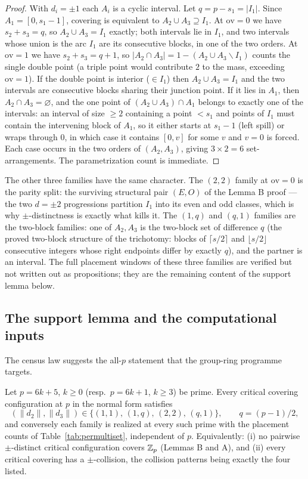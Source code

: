 \begin{proof}
With $d_i=\pm1$ each $A_i$ is a cyclic interval. Let $q=p-s_1=|I_1|$. Since
$A_1=[0,s_1-1]$, covering is equivalent to $A_2\cup A_3\supseteq I_1$.
At $\mathrm{ov}=0$ we have $s_2+s_3=q$, so $A_2\cup A_3=I_1$ exactly; both
intervals lie in $I_1$, and two intervals whose union is the arc $I_1$ are
its consecutive blocks, in one of the two orders. At $\mathrm{ov}=1$ we have
$s_2+s_3=q+1$, so $|A_2\cap A_3|=1-(A_2\cup A_3\smallsetminus I_1)$ counts
the single double point (a triple point would contribute $2$ to the mass,
exceeding $\mathrm{ov}=1$). If the double point is interior
($\in I_1$) then $A_2\cup A_3=I_1$ and the two intervals are consecutive
blocks sharing their junction point. If it lies in $A_1$, then
$A_2\cap A_3=\varnothing$, and the one point of $(A_2\cup A_3)\cap A_1$
belongs to exactly one of the intervals: an interval of size $\ge2$
containing a point $<s_1$ and points of $I_1$ must contain the intervening
block of $A_1$, so it either starts at $s_1-1$ (left spill) or wraps through
$0$, in which case it contains $[0,v]$ for some $v$ and $v=0$ is forced.
Each case occurs in the two orders of $(A_2,A_3)$, giving $3\times2=6$
set-arrangements. The parametrization count is immediate.
\end{proof}

The other three families have the same character. The $(2,2)$ family at
$\mathrm{ov}=0$ is the parity split: the surviving structural pair
$(E,O)$ of the Lemma B proof --- the two $d=\pm2$ progressions partition
$I_1$ into its even and odd classes, which is why $\pm$-distinctness is
exactly what kills it. The $(1,q)$ and $(q,1)$ families are the two-block
families: one of $A_2,A_3$ is the two-block set of difference $q$
(the proved two-block structure of the trichotomy: blocks of
$\lceil s/2\rceil$ and $\lfloor s/2\rfloor$ consecutive integers whose right
endpoints differ by exactly $q$), and the partner is an interval. The full
placement windows of these three families are verified but not written out
as propositions; they are the remaining content of the support lemma below.

\subsection{The support lemma and the computational inputs}
\label{sec:gt-support}

The census law suggests the all-$p$ statement that the group-ring programme
targets.

\begin{conjecture}\label{conj:SL}
Let $p=6k+5$, $k\ge0$ (resp.\ $p=6k+1$, $k\ge3$) be prime. Every critical
covering configuration at $p$ in the normal form satisfies
\[
(\|d_2\|,\|d_3\|)\in\{(1,1),\,(1,q),\,(2,2),\,(q,1)\},
\qquad q=(p-1)/2,
\]
and conversely each family is realized at every such prime with the
placement counts of Table~\ref{tab:permultiset}, independent of $p$.
Equivalently: \textup{(i)} no pairwise $\pm$-distinct critical
configuration covers $\mathbb{Z}_p$ (Lemmas B and A), and \textup{(ii)} every
critical covering has a $\pm$-collision, the collision patterns being
exactly the four listed.
\end{conjecture}

